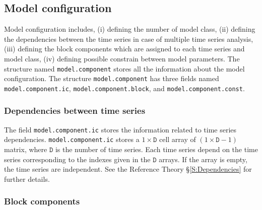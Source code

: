 \subsection{Model configuration}
\label{S:MODELCONFIGURATION}
Model configuration includes, (i) defining the number of model class, (ii) defining the dependencies between the time series in case of multiple time series analysis, (iii) defining the block components which are assigned to each time series and model class, (iv) defining possible constrain between model parameters.
The \MATLAB{} structure named \lstinline[basicstyle = \mlttfamily]!model.component! stores all the information about the model configuration.
The structure \lstinline[basicstyle = \mlttfamily]!model.component! has three fields named  \lstinline[basicstyle = \mlttfamily]!model.component.ic!, \lstinline[basicstyle = \mlttfamily]!model.component.block!, and \lstinline[basicstyle = \mlttfamily]!model.component.const!.

\subsubsection{Dependencies between time series}

The field \lstinline[basicstyle = \mlttfamily]!model.component.ic! stores the information related to time series dependencies.
\lstinline[basicstyle = \mlttfamily \small ]!model.component.ic! stores a $1\times \mathtt{D}$ cell array of $(1\times \mathtt{D}-1)$ matrix, where $\mathtt{D}$ is the number of time series.
Each time series depend on the time series corresponding to the indexes given in the $\mathtt{D}$ arrays.
If the array is empty, the time series are independent. See the Reference Theory \S\ref{S:Dependencies} for further details.

\subsubsection{Block components}

